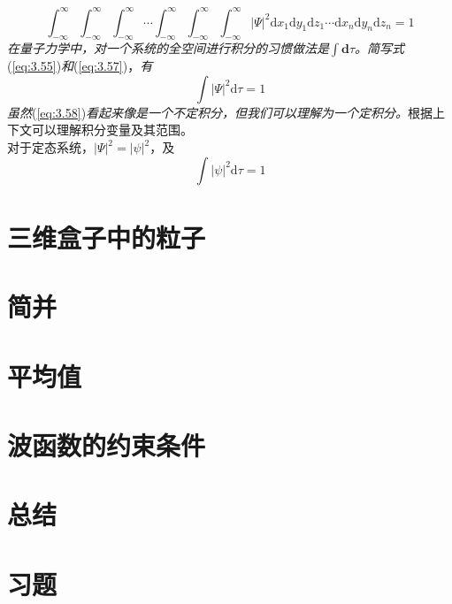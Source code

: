 	\begin{equation}
		\int_{-\infty}^{\infty}\int_{-\infty}^{\infty}\int_{-\infty}^{\infty}\cdots\int_{-\infty}^{\infty}\int_{-\infty}^{\infty}\int_{-\infty}^{\infty}\left|\Psi\right|^2 \mathrm{d}x_1\mathrm{d}y_1\mathrm{d}z_1\cdots\mathrm{d}x_n\mathrm{d}y_n\mathrm{d}z_n = 1
		\label{eq:3.57}
	\end{equation}
	\textit{在量子力学中，对一个系统的全空间进行积分的习惯做法是$\int\mathbf{d}\tau$。简写式}(\ref{eq:3.55})\textit{和}(\ref{eq:3.57})，\textit{有}
	\begin{equation}
		\boxed{
			\int\left|\Psi\right|^2\mathrm{d}\tau = 1
		}
		\label{eq:3.58}
	\end{equation}
	\textit{虽然}(\ref{eq:3.58})\textit{看起来像是一个不定积分，但我们可以理解为一个定积分。}根据上下文可以理解积分变量及其范围。\\
	\indent 对于定态系统，$\left|\Psi\right|^2 = \left|\psi\right|^2$，及
	\begin{equation}
		\boxed{
			\int\left|\psi\right|^2\mathrm{d}\tau = 1
		}
		\label{eq:3.59}
	\end{equation}
	
	
	
	

\section{三维盒子中的粒子}

\section{简并}

\section{平均值}

\section{波函数的约束条件}

\section*{总结}

\section*{习题}
